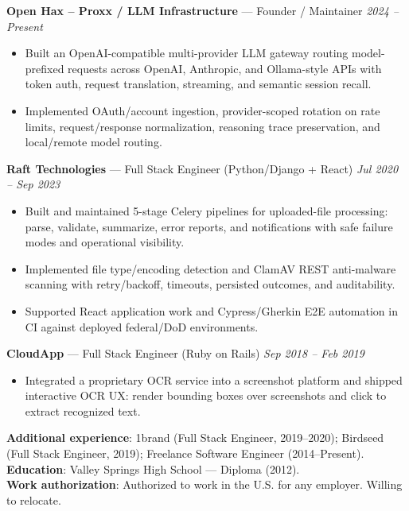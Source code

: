 \documentclass[10pt]{article}
\begin{document}
\textbf{Open Hax -- Proxx / LLM Infrastructure} --- Founder / Maintainer \hfill \textit{2024 -- Present}\\
\vspace{-7pt}
\begin{itemize}
  \setlength\itemsep{-3pt}
  \setlength\parskip{0pt}
  \setlength\parsep{0pt}
  \item Built an OpenAI-compatible multi-provider LLM gateway routing model-prefixed requests across OpenAI, Anthropic, and Ollama-style APIs with token auth, request translation, streaming, and semantic session recall.
  \item Implemented OAuth/account ingestion, provider-scoped rotation on rate limits, request/response normalization, reasoning trace preservation, and local/remote model routing.
\end{itemize}

\textbf{Raft Technologies} --- Full Stack Engineer (Python/Django + React) \hfill \textit{Jul 2020 -- Sep 2023}\\
\vspace{-7pt}
\begin{itemize}
  \setlength\itemsep{-3pt}
  \setlength\parskip{0pt}
  \setlength\parsep{0pt}
  \item Built and maintained 5-stage Celery pipelines for uploaded-file processing: parse, validate, summarize, error reports, and notifications with safe failure modes and operational visibility.
  \item Implemented file type/encoding detection and ClamAV REST anti-malware scanning with retry/backoff, timeouts, persisted outcomes, and auditability.
  \item Supported React application work and Cypress/Gherkin E2E automation in CI against deployed federal/DoD environments.
\end{itemize}

\textbf{CloudApp} --- Full Stack Engineer (Ruby on Rails) \hfill \textit{Sep 2018 -- Feb 2019}\\
\vspace{-7pt}
\begin{itemize}
  \setlength\itemsep{-3pt}
  \setlength\parskip{0pt}
  \setlength\parsep{0pt}
  \item Integrated a proprietary OCR service into a screenshot platform and shipped interactive OCR UX: render bounding boxes over screenshots and click to extract recognized text.
\end{itemize}

\textbf{Additional experience}: 1brand (Full Stack Engineer, 2019--2020); Birdseed (Full Stack Engineer, 2019); Freelance Software Engineer (2014--Present).\\
\textbf{Education}: Valley Springs High School --- Diploma (2012).\\
\textbf{Work authorization}: Authorized to work in the U.S. for any employer. Willing to relocate.
\end{document}

